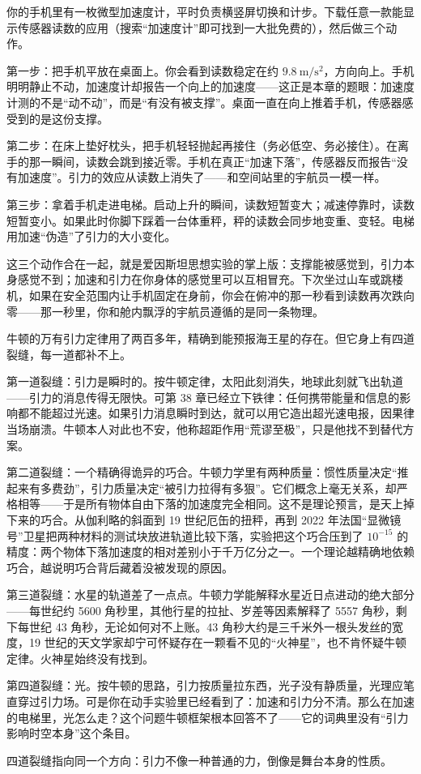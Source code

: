 
\begin{experiment}[用手机加速度计“抓住”引力]
你的手机里有一枚微型加速度计，平时负责横竖屏切换和计步。下载任意一款能显示传感器读数的应用（搜索“加速度计”即可找到一大批免费的），然后做三个动作。

第一步：把手机平放在桌面上。你会看到读数稳定在约 \(9.8\ \mathrm{m/s^{2}}\)，方向向上。手机明明静止不动，加速度计却报告一个向上的加速度——这正是本章的题眼：加速度计测的不是“动不动”，而是“有没有被支撑”。桌面一直在向上推着手机，传感器感受到的是这份支撑。

第二步：在床上垫好枕头，把手机轻轻抛起再接住（务必低空、务必接住）。在离手的那一瞬间，读数会跳到接近零。手机在真正“加速下落”，传感器反而报告“没有加速度”。引力的效应从读数上消失了——和空间站里的宇航员一模一样。

第三步：拿着手机走进电梯。启动上升的瞬间，读数短暂变大；减速停靠时，读数短暂变小。如果此时你脚下踩着一台体重秤，秤的读数会同步地变重、变轻。电梯用加速“伪造”了引力的大小变化。

这三个动作合在一起，就是爱因斯坦思想实验的掌上版：支撑能被感觉到，引力本身感觉不到；加速和引力在你身体的感觉里可以互相冒充。下次坐过山车或跳楼机，如果在安全范围内让手机固定在身前，你会在俯冲的那一秒看到读数再次跌向零——那一秒里，你和舱内飘浮的宇航员遵循的是同一条物理。
\end{experiment}


\begin{mainline}
牛顿的万有引力定律用了两百多年，精确到能预报海王星的存在。但它身上有四道裂缝，每一道都补不上。

第一道裂缝：引力是瞬时的。按牛顿定律，太阳此刻消失，地球此刻就飞出轨道——引力的消息传得无限快。可第 38 章已经立下铁律：任何携带能量和信息的影响都不能超过光速。如果引力消息瞬时到达，就可以用它造出超光速电报，因果律当场崩溃。牛顿本人对此也不安，他称超距作用“荒谬至极”，只是他找不到替代方案。

第二道裂缝：一个精确得诡异的巧合。牛顿力学里有两种质量：惯性质量决定“推起来有多费劲”，引力质量决定“被引力拉得有多狠”。它们概念上毫无关系，却严格相等——于是所有物体自由下落的加速度完全相同。这不是理论预言，是天上掉下来的巧合。从伽利略的斜面到 19 世纪厄缶的扭秤，再到 2022 年法国“显微镜号”卫星把两种材料的测试块放进轨道比较下落，实验把这个巧合压到了 \(10^{-15}\) 的精度：两个物体下落加速度的相对差别小于千万亿分之一。一个理论越精确地依赖巧合，越说明巧合背后藏着没被发现的原因。

第三道裂缝：水星的轨道差了一点点。牛顿力学能解释水星近日点进动的绝大部分——每世纪约 5600 角秒里，其他行星的拉扯、岁差等因素解释了 5557 角秒，剩下每世纪 43 角秒，无论如何对不上账。43 角秒大约是三千米外一根头发丝的宽度，19 世纪的天文学家却宁可怀疑存在一颗看不见的“火神星”，也不肯怀疑牛顿定律。火神星始终没有找到。

第四道裂缝：光。按牛顿的思路，引力按质量拉东西，光子没有静质量，光理应笔直穿过引力场。可是你在动手实验里已经看到了：加速和引力分不清。那么在加速的电梯里，光怎么走？这个问题牛顿框架根本回答不了——它的词典里没有“引力影响时空本身”这个条目。

四道裂缝指向同一个方向：引力不像一种普通的力，倒像是舞台本身的性质。
\end{mainline}

